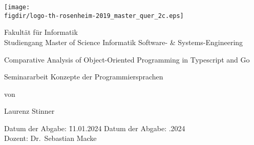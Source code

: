 \begin{titlepage}

    \sffamily

    \raggedleft

    \vspace*{-2cm}

    \texttt{[image: \\figdir/logo-th-rosenheim-2019\_master\_quer\_2c.eps]}

    \vfill

    \centering
    \LARGE
    Fakultät für Informatik  \vspace{0.5cm}\\
    \Large
    Studiengang Master of Science Informatik Software- \& Systems-Engineering

    \vspace{2cm}

    \LARGE

    Comparative Analysis of Object-Oriented Programming in Typescript and Go

    \vspace{2cm}

    \Large
    Seminararbeit Konzepte der Programmiersprachen

    \vspace{1.5cm}


    \Large
    von

    \vspace{0.5cm}


    \LARGE
    Laurenz Stinner \vspace{1cm}

    \vspace{1cm}

    \flushleft
    \Large
    \vspace*{\fill}

    \begin{tabbing}
        Datum der Abgabe: \= 11.01.2024 \kill
        Datum der Abgabe: .2024 \\
        Dozent: \> Dr.\ Sebastian Macke
    \end{tabbing}

\end{titlepage}



